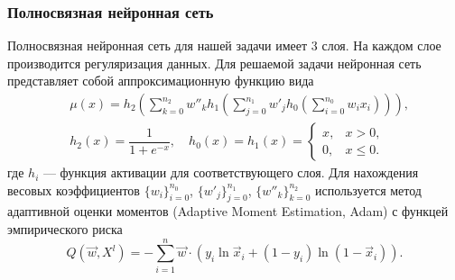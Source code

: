 \documentclass[compress,professionalfont]{beamer}
\begin{document}
\begin{frame}
\frametitle{Полносвязная нейронная сеть}
\small

Полносвязная нейронная сеть для нашей задачи имеет 3 слоя. На каждом слое производится регуляризация данных.
%
Для решаемой задачи нейронная сеть представляет собой аппроксимационную функцию вида
\begin{align*}
& \mu(x) = h_2 \left(\sum_{k=0}^{n_2} w''_k h_1\left(\sum_{j=0}^{n_1} w'_j h_0\left( \sum_{i=0}^{n_0} w_i x_i \right)\right)\right), \\
& h_2(x) = \dfrac{1}{1+e^{-x}}, \quad h_0(x) = h_1(x) = 
\begin{cases} 
x, & x > 0, \\
0, & x \leqslant 0.
\end{cases}
\end{align*}
где $h_i$ --- функция активации для соответствующего слоя. Для нахождения весовых коэффициентов $\{w_i\}_{i=0}^{n_0}$, $\{w'_j\}_{j=0}^{n_1}$, $\{w''_k\}_{k=0}^{n_2}$ используется метод адаптивной оценки моментов (Adaptive Moment Estimation, Adam) с функцей эмпирического риска
$$
Q\left(\vec{w}, X^l\right) = - \sum_{i=1}^{n} \vec{w} \cdot (y_i \ln \vec{x}_i + (1 - y_i)\ln (1 - \vec{x}_i)).
$$

\end{frame}
\end{document}
